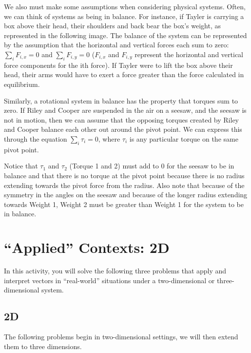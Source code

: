 \documentclass{ximera}
\begin{document}
We also must make some assumptions when considering physical systems. Often, we can think of systems as being in balance. For instance, if Tayler is carrying a box above their head, their shoulders and back bear the box's weight, as represented in the following image. The balance of the system can be represented by the assumption that the horizontal and vertical forces each sum to zero: $\sum_iF_{i,x}=0$ and $\sum_iF_{i,y}=0$ ($F_{i,x}$ and $F_{i,y}$ represent the horizontal and vertical force components for the ith force). If Tayler were to lift the box above their head, their arms would have to exert a force greater than the force calculated in equilibrium.


Similarly, a rotational system in balance has the property that torques sum to zero. If Riley and Cooper are suspended in the air on a seesaw, and the seesaw is not in motion, then we can assume that the opposing torques created by Riley and Cooper balance each other out around the pivot point. We can express this through the equation $\sum_i\tau_i=0$, where $\tau_i$ is any particular torque on the same pivot point.


Notice that $\tau_1$ and $\tau_2$ (Torque 1 and 2) must add to 0 for the seesaw to be in balance and that there is no torque at the pivot point because there is no radius extending towards the pivot force from the radius. Also note that because of the symmetry in the angles on the seesaw and because of the longer radius extending towards Weight 1, Weight 2 must be greater than Weight 1 for the system to be in balance.

\section*{``Applied'' Contexts: 2D}

In this activity, you will solve the following three problems that apply and interpret vectors in ``real-world'' situations under a two-dimensional or three-dimensional system.

\subsection*{2D}

The following problems begin in two-dimensional settings, we will then extend them to three dimensions.
\end{document}
